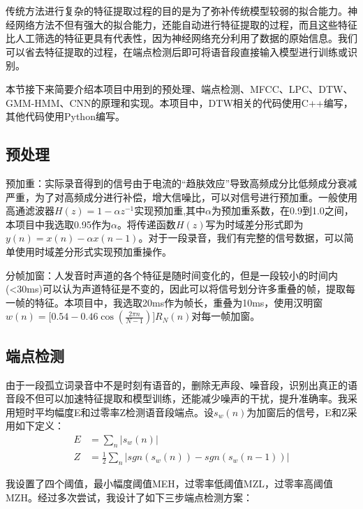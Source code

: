 \documentclass[UTF8]{article}
\begin{document}
传统方法进行复杂的特征提取过程的目的是为了弥补传统模型较弱的拟合能力。神经网络方法不但有强大的拟合能力，还能自动进行特征提取的过程，而且这些特征比人工筛选的特征更具有代表性，因为神经网络充分利用了数据的原始信息。我们可以省去特征提取的过程，在端点检测后即可将语音段直接输入模型进行训练或识别。

本节接下来简要介绍本项目中用到的预处理、端点检测、MFCC、LPC、DTW、GMM-HMM、CNN的原理和实现。本项目中，DTW相关的代码使用C++编写，其他代码使用Python编写。

\subsection{预处理}
预加重：实际录音得到的信号由于电流的``趋肤效应''导致高频成分比低频成分衰减严重，为了对高频成分进行补偿，增大信噪比，可以对信号进行预加重。一般使用高通滤波器$H(z)=1-\alpha z^{-1}$实现预加重,其中$\alpha$为预加重系数，在0.9到1.0之间，本项目中我选取0.95作为$\alpha$。将传递函数$H(z)$写为时域差分形式即为$y(n)=x(n)-\alpha x(n-1)$。对于一段录音，我们有完整的信号数据，可以简单使用时域差分形式实现预加重操作。

分帧加窗：人发音时声道的各个特征是随时间变化的，但是一段较小的时间内(<30ms)可以认为声道特征是不变的，因此可以将信号划分许多重叠的帧，提取每一帧的特征。本项目中，我选取20ms作为帧长，重叠为10ms，使用汉明窗$w(n)=\bigg[ 0.54-0.46 \cos(\frac{2\pi n}{N-1})\bigg]R_N(n)$对每一帧加窗。

\subsection{端点检测}
由于一段孤立词录音中不是时刻有语音的，删除无声段、噪音段，识别出真正的语音段不但可以加速特征提取和模型训练，还能减少噪声的干扰，提升准确率。我采用短时平均幅度E和过零率Z检测语音段端点。设$s_w(n)$为加窗后的信号，E和Z采用如下定义：
\begin{align*}
	E & =\sum_n |s_w(n)|                               \\ 
	Z & =\frac{1}{2}\sum_n |sgn(s_w(n))-sgn(s_w(n-1))| 
\end{align*}

我设置了四个阈值，最小幅度阈值MEH，过零率低阈值MZL，过零率高阈值MZH。经过多次尝试，我设计了如下三步端点检测方案：
\end{document}

